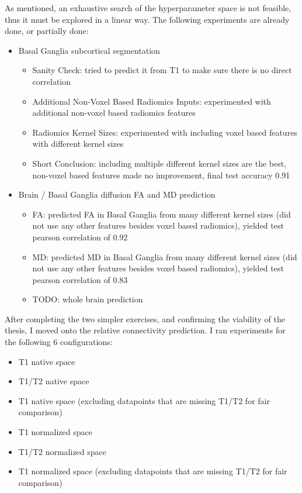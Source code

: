 As mentioned, an exhaustive search of the hyperparameter space is not feasible, thus it must be explored in a linear way. The following experiments are already done, or partially done:

\begin{itemize}
  \item Basal Ganglia subcortical segmentation
  \begin{itemize}
    \item Sanity Check: tried to predict it from T1 to make sure there is no direct correlation
    \item Additional Non-Voxel Based Radiomics Inputs: experimented with additional non-voxel based radiomics features
    \item Radiomics Kernel Sizes: experimented with including voxel based features with different kernel sizes
    \item Short Conclusion: including multiple different kernel sizes are the best, non-voxel based features made no improvement, final test accuracy 0.91
  \end{itemize}
  \item Brain / Basal Ganglia diffusion \ac{FA} and \ac{MD} prediction
  \begin{itemize}
    \item \ac{FA}: predicted \ac{FA} in Basal Ganglia from many different kernel sizes (did not use any other features besides voxel based radiomics), yielded test pearson correlation of 0.92
    \item \ac{MD}: predicted \ac{MD} in Basal Ganglia from many different kernel sizes (did not use any other features besides voxel based radiomics), yielded test pearson correlation of 0.83
    \item TODO: whole brain prediction
  \end{itemize}
\end{itemize}

After completing the two simpler exercises, and confirming the viability of the thesis, I moved onto the relative connectivity prediction. I ran experiments for the following 6 configurations:

\begin{itemize}
  \item T1 native space
  \item T1/T2 native space
  \item T1 native space (excluding datapoints that are missing T1/T2 for fair comparison)
  \item T1 normalized space
  \item T1/T2 normalized space
  \item T1 normalized space (excluding datapoints that are missing T1/T2 for fair comparison)
\end{itemize}

